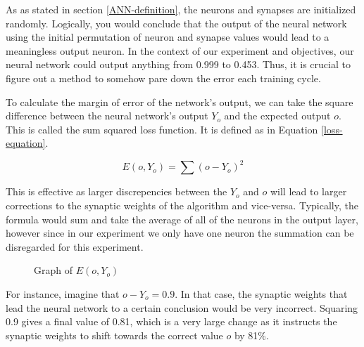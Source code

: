 \documentclass[12pt]{article}
\begin{document}
        As as stated in section \ref{ANN-definition}, the neurons and synapses are initialized randomly. Logically, you would conclude that the output of the neural network using the initial permutation of neuron and synapse values would lead to a meaningless output neuron. In the context of our experiment and objectives, our neural network could output anything from 0.999 to 0.453. Thus, it is crucial to figure out a method to somehow pare down the error each training cycle. 

        To calculate the margin of error of the network's output, we can take the square difference between the neural network's output \(Y_o\) and the expected output \(o\). This is called the sum squared loss function. It is defined as in Equation \ref{loss-equation}. 

        \begin{equation} \label{loss-equation}
            E(o , Y_o) = \sum (o - Y_o)^2
        \end{equation}

        This is effective as larger discrepencies between the $Y_o$ and $o$ will lead to larger corrections to the synaptic weights of the algorithm and vice-versa. Typically, the formula would sum and take the average of all of the neurons in the output layer, however since in our experiment we only have one neuron the summation can be disregarded for this experiment.

        \begin{figure}[h]
            \centering
            \caption{Graph of $E(o, Y_o)$ \label{errorgraph}}
        \end{figure}

        For instance, imagine that $o - Y_o = 0.9$. In that case, the synaptic weights that lead the neural network to a certain conclusion would be very incorrect. Squaring 0.9 gives a final value of 0.81, which is a very large change as it instructs the synaptic weights to shift towards the correct value $o$ by 81\%.
\end{document}
